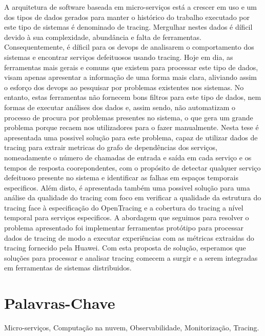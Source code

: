 A arquitetura de software baseada em micro-serviços está a crescer em uso e um dos tipos de dados gerados para manter o histórico do trabalho executado por este tipo de sistemas é denominado de tracing.
Mergulhar nestes dados é díficil devido à sua complexidade, abundância e falta de ferramentas. Consequentemente, é díficil para os \gls{devops} de analisarem o comportamento dos sistemas e encontrar serviços defeituosos usando tracing.
Hoje em dia, as ferramentas mais gerais e comuns que existem para processar este tipo de dados, visam apenas apresentar a informação de uma forma mais clara, aliviando assim o esforço dos \gls{devops} ao pesquisar por problemas existentes nos sistemas. No entanto, estas ferramentas não fornecem bons filtros para este tipo de dados, nem formas de executar análises dos dados e, assim sendo, não automatizam o processo de procura por problemas presentes no sistema, o que gera um grande problema porque recaem nos utilizadores para o fazer manualmente.
Nesta tese é apresentada uma possivel solução para este problema, capaz de utilizar dados de tracing para extrair metricas do grafo de dependências dos serviços, nomeadamente o número de chamadas de entrada e saída em cada serviço e os tempos de resposta coorepondentes, com o propósito de detectar qualquer serviço defeituoso presente no sistema e identificar as falhas em espaços temporais especificos. Além disto, é apresentada também uma possivel solução para uma análise da qualidade do tracing com foco em verificar a qualidade da estrutura do tracing face à especificação do OpenTracing e a cobertura do tracing a nível temporal para serviços especificos.
A abordagem que seguimos para resolver o problema apresentado foi implementar ferramentas protótipo para processar dados de tracing de modo a executar experiências com as métricas extraidas do tracing fornecido pela Huawei.
Com esta proposta de solução, esperamos que soluções para processar e analisar tracing comecem a surgir e a serem integradas em ferramentas de sistemas distribuidos.

\section*{Palavras-Chave}
\label{sec:palavras}

Micro-serviços, Computação na nuvem, Observabilidade, Monitorização, Tracing.

\restoregeometry